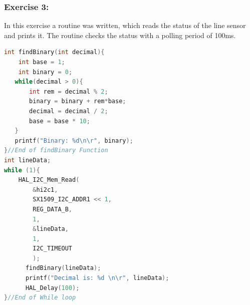 \documentclass[english]{article}
\begin{document}
\subsubsection{Exercise 3:}
In this exercise a routine was written, which reads the status of the 
line sensor and prints it. The routine checks the status with a polling period of 100ms.
\begin{lstlisting}[language=C, caption={Reading Line Data}, label={lst:ReadLine} ]
int findBinary(int decimal){
	int base = 1;
	int binary = 0;
   while(decimal > 0){
	   int rem = decimal % 2;
	   binary = binary + rem*base;
	   decimal = decimal / 2;
	   base = base * 10;
   }
   printf("Binary: %d\n\r", binary);
}//End of findBinary Function
int lineData;
while (1){
    HAL_I2C_Mem_Read(
        &hi2c1,
        SX1509_I2C_ADDR1 << 1,
        REG_DATA_B,
        1,
        &lineData,
        1,
        I2C_TIMEOUT
        );
	  findBinary(lineData);
	  printf("Decimal is: %d \n\r", lineData);
	  HAL_Delay(100);
}//End of While loop
\end{lstlisting}


\newpage
\end{document}
